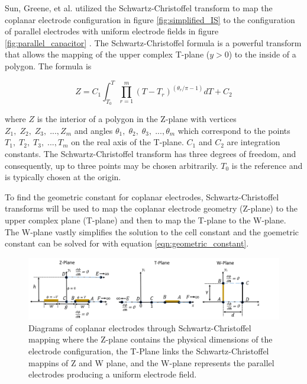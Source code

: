  
    \par Sun, Greene, et al. utilized the Schwartz-Christoffel transform to map the coplanar electrode configuration in figure \ref{fig:simplified_IS} to the configuration of parallel electrodes with uniform electrode fields in figure \ref{fig:parallel_capacitor} \cite{sun_analytical_2007}. The Schwartz-Christoffel formula is a powerful transform that allows the mapping of the upper complex T-plane ($y>0$) to the inside of a polygon. The formula is
    
    \begin{equation}
        Z = C_1 \int_{T_0}^T \prod^m_{r=1} (T - T_r)^{(\theta_r/\pi - 1)} dT + C_2
    \end{equation}
    
    \noindent where $Z$ is the interior of a polygon in the Z-plane with vertices $Z_1,\;Z_2,\;Z_3,\; ...,Z_m$ and angles $\theta_1,\;\theta_2,\;\theta_3,\; ...,\theta_m$ which correspond to the points $T_1,\;T_2,\;T_3,\; ...,T_m$ on the real axis of the T-plane. $C_1$ and $C_2$ are integration constants. The Schwartz-Christoffel transform has three degrees of freedom, and consequently, up to three points may be chosen arbitrarily. $T_0$ is the reference and is typically chosen at the origin.
    
    \par To find the geometric constant for coplanar electrodes, Schwartz-Christoffel transforms will be used to map the coplanar electrode geometry (Z-plane) to the upper complex plane (T-plane) and then to map the T-plane to the W-plane. The W-plane vastly simplifies the solution to the cell constant and the goemetric constant can be solved for with equation \ref{eqn:geometric_constant}. 
    
    \begin{figure}[h]
        \centering
        \includegraphics[width=\textwidth]{images/scmPlanes.png}
        \caption[Diagrams of coplanar electrodes through Schwartz-Christoffel mapping]{Diagrams of coplanar electrodes through Schwartz-Christoffel mapping where the Z-plane contains the physical dimensions of the electrode configuration, the T-Plane links the Schwartz-Christoffel mappins of Z and W plane, and the W-plane represents the parallel electrodes producing a uniform electrode field.}
        \label{fig:scm_planes}
    \end{figure}
    
